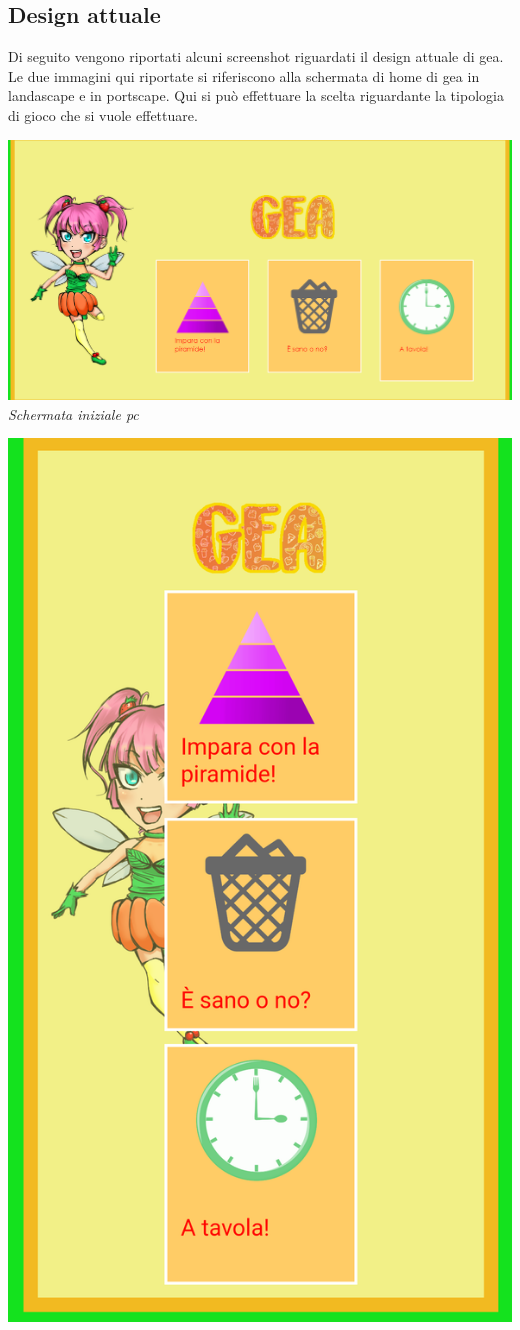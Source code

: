 \subsection{Design attuale}
Di seguito vengono riportati alcuni screenshot riguardati il design attuale di \acs{gea}.\\
Le due immagini qui riportate si riferiscono alla schermata di home di \acs{gea} in landascape e in portscape. Qui si può effettuare la scelta riguardante la tipologia di gioco che si vuole effettuare.

\begin{center}
\begin{minipage}[c]{.40\textwidth}
\centering
\includegraphics[width=.70\textwidth]{Images/Design/Game}\\
\vspace{10px}
\emph{Schermata iniziale pc}\bigskip
\end{minipage}
\hspace{10mm}
\begin{minipage}[c]{.40\textwidth}
\centering
\includegraphics[width=.70\textwidth]{Images/Design/Homesmartphone}\\

\end{minipage}
\end{center}
